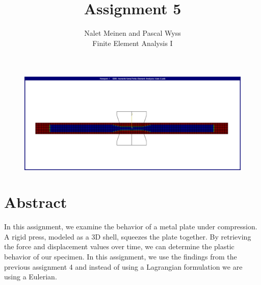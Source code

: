 \documentclass[12pt]{article}
\begin{document}


\title{Assignment 5}%
\author{Nalet Meinen and Pascal Wyss\\ %
Finite Element Analysis I
}
\maketitle

\begin{figure}[!htb]
  \centering
  \vspace*{1cm}
  \includegraphics[trim={2cm 2cm 2cm 2cm},clip,width=1.0\linewidth]{pics/titelbild}
  \label{fig:0}
\end{figure}

\newpage

\section*{Abstract}
In this assignment, we examine the behavior of a metal plate under compression.
A rigid press, modeled as a 3D shell, squeezes the plate together.
By retrieving the force and displacement values over time, we can determine the plastic behavior 
of our specimen. In this assignment, we use the findings from the previous assignment 4 and 
instead of using a Lagrangian formulation we are using a Eulerian.



\tableofcontents
\pagebreak
\end{document}
